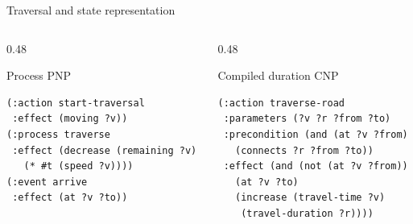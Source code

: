 \documentclass[aspectratio=169,10pt,t]{beamer}
\begin{document}
	\begin{frame}[fragile]{Traversal and state representation}
		\vspace{-0.20cm}
		\begin{columns}[T,onlytextwidth]
			\begin{column}{0.48\textwidth}
				\begin{block}{Process \hfill \textnormal{PNP}}
\begin{lstlisting}[basicstyle=\ttfamily\scriptsize]
(:action start-traversal
 :effect (moving ?v))
(:process traverse
 :effect (decrease (remaining ?v)
   (* #t (speed ?v))))
(:event arrive
 :effect (at ?v ?to))
\end{lstlisting}
				\end{block}
			\end{column}
			\begin{column}{0.48\textwidth}
				\begin{block}{Compiled duration \hfill \textnormal{CNP}}
\begin{lstlisting}[basicstyle=\ttfamily\scriptsize]
(:action traverse-road
 :parameters (?v ?r ?from ?to)
 :precondition (and (at ?v ?from)
   (connects ?r ?from ?to))
 :effect (and (not (at ?v ?from))
   (at ?v ?to)
   (increase (travel-time ?v)
    (travel-duration ?r))))
\end{lstlisting}
				\end{block}
			\end{column}
		\end{columns}
		

\end{frame}
\end{document}
